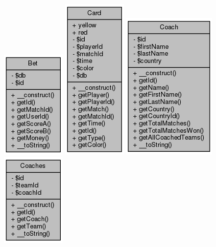 \documentclass[11pt]{article}
\begin{document}
\includegraphics[scale=0.4]{UML_Bet.png}
\includegraphics[scale=0.4]{UML_Card.png}
\includegraphics[scale=0.4]{UML_Coach.png}
\includegraphics[scale=0.4]{UML_Coaches.png}
\end{document}
